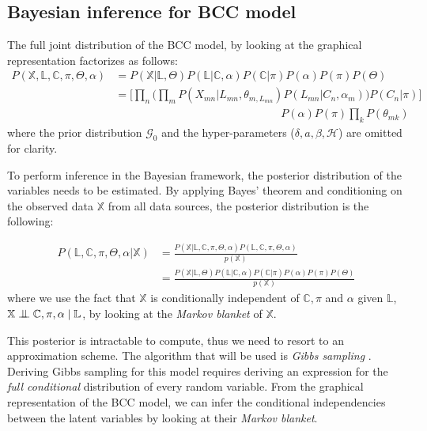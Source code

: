 \subsection{Bayesian inference for BCC model}\label{integr-bayes-inference-subsect}
The full joint distribution of the BCC model, by looking at the graphical representation factorizes as follows:
\begin{equation}%
  \begin{aligned}
	P(\mathbb{X}, \mathbb{L}, \mathbb{C}, \pi , \Theta , \alpha) & = P(\mathbb{X}|\mathbb{L},\Theta) P(\mathbb{L}|\mathbb{C},\alpha) P(\mathbb{C}|\pi) P(\alpha) P(\pi) P(\Theta) \\
	  & = \bigg[\prod_{n}\bigg(\prod_{m} P(X_{mn}|L_{mn},\theta_{m,L_{mn}}) P(L_{mn}|C_{n},\alpha_{m})\bigg) P(C_{n}|\pi)\bigg] \\
	  & \quad \quad \quad \quad \quad \quad \quad \quad \quad \quad \quad \quad \quad \quad \quad P(\alpha) P(\pi) \prod_{k} P(\theta_{mk})
  \end{aligned}
\end{equation}
where the prior distribution $\mathcal{G}_{0}$ and the hyper-parameters ($\delta, \mathit{a}, \beta, \mathcal{H}$) are omitted for clarity.

To perform inference in the Bayesian framework, the posterior distribution of the variables needs to be estimated. By applying Bayes' theorem and conditioning on the observed data $\mathbb{X}$ from all data sources, the posterior distribution is the following:

\begin{equation}%
	\begin{aligned}
	P(\mathbb{L},\mathbb{C},\pi,\Theta,\alpha | \mathbb{X}) & = \frac{P(\mathbb{X}|\mathbb{L},\mathbb{C},\pi,\Theta,\alpha) P(\mathbb{L},\mathbb{C},\pi,\Theta,\alpha)}{p(\mathbb{X})} \\
	& = \frac{P(\mathbb{X}|\mathbb{L},\Theta) P(\mathbb{L}|\mathbb{C},\alpha) P(\mathbb{C}|\pi) P(\alpha) P(\pi) P(\Theta)}{p(\mathbb{X})}
	\end{aligned}
\end{equation}
where we use the fact that $\mathbb{X}$ is conditionally independent of $\mathbb{C}, \pi$ and $\alpha$ given $\mathbb{L}$, \ie $\mathbb{X} \bigCI \mathbb{C}, \pi, \alpha \mid \mathbb{L}$, by looking at the \emph{Markov blanket} of $\mathbb{X}$. 

This posterior is intractable to compute, thus we need to resort to an approximation scheme. The algorithm that will be used is \emph{Gibbs sampling} \citep{Geman1984}. Deriving Gibbs sampling for this model requires deriving an expression for the \emph{full conditional} distribution of every random variable. From the graphical representation of the BCC model, we can infer the conditional independencies between the latent variables by looking at their \emph{Markov blanket}. 

